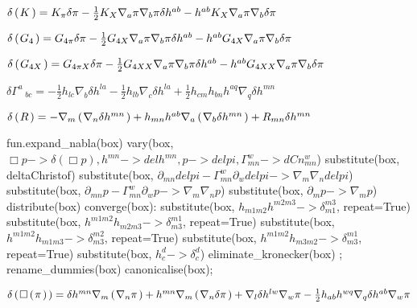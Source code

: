 \documentclass[10pt]{article}
\newcommand\brwrap[3]{%
  \setbox0=\hbox{$#2$}
  \left#1\vbox to \the\ht0{\hbox to 0pt{}}\right.\kern-.2em
  \begingroup #2\endgroup\kern-.15em
  \left.\vbox to \the\ht0{\hbox to 0pt{}}\right#3
}
\begin{document}
\begin{adjustwidth}{1em}{0cm}${}\delta\brwrap{(}{K}{)} = K_{\pi} \delta\pi - \frac{1}{2}K_{X} \nabla_{a}{\pi} \nabla_{b}{\pi} \delta h^{a b}-h^{a b} K_{X} \nabla_{a}{\pi} \nabla_{b}{\delta\pi}$\end{adjustwidth}
\begin{adjustwidth}{1em}{0cm}${}\delta\brwrap{(}{{G_{4}}}{)} = G_{4\pi} \delta\pi - \frac{1}{2}G_{4X} \nabla_{a}{\pi} \nabla_{b}{\pi} \delta h^{a b}-h^{a b} G_{4X} \nabla_{a}{\pi} \nabla_{b}{\delta\pi}$\end{adjustwidth}
\begin{adjustwidth}{1em}{0cm}${}\delta\brwrap{(}{G_{4X}}{)} = G_{4\pi X} \delta\pi - \frac{1}{2}G_{4XX} \nabla_{a}{\pi} \nabla_{b}{\pi} \delta h^{a b}-h^{a b} G_{4XX} \nabla_{a}{\pi} \nabla_{b}{\delta\pi}$\end{adjustwidth}
\begin{adjustwidth}{1em}{0cm}${}\delta\Gamma^{a}\,_{b c} =  - \frac{1}{2}h_{l c} \nabla_{b}{\delta h^{l a}} - \frac{1}{2}h_{l b} \nabla_{c}{\delta h^{l a}}+\frac{1}{2}h_{c m} h_{b n} h^{a q} \nabla_{q}{\delta h^{m n}}$\end{adjustwidth}
\begin{adjustwidth}{1em}{0cm}${}\delta\brwrap{(}{R}{)} = -\nabla_{m}\brwrap{(}{\nabla_{n}{\delta h^{m n}}}{)}+h_{m n} h^{a b} \nabla_{a}\brwrap{(}{\nabla_{b}{\delta h^{m n}}}{)}+R_{m n} \delta h^{m n}$\end{adjustwidth}
\begin{python}
fun.expand_nabla(box)
vary(box, $\Box{p} -> \delta(\Box{p}), h^{m n} -> delh^{m n}, p -> delpi, \Gamma^{w}_{m n} -> dCn^{w}_{m n}$)
substitute(box, deltaChristof)
substitute(box, $\partial_{m n}{delpi} - \Gamma^{w}_{m n}\partial_{w}{delpi} -> \nabla_{m}{\nabla_{n}{delpi}}$)
substitute(box, $\partial_{m n}{p} - \Gamma^{w}_{m n}\partial_{w}{p} -> \nabla_{m}{\nabla_{n}{p}}$)
substitute(box, $\partial_{m}{p} -> \nabla_{m}{p}$)
distribute(box)
converge(box):
	substitute(box, $h_{m1 m2}h^{m2 m3} -> \delta^{m3}_{m1}$, repeat=True)
	substitute(box, $h^{m1 m2}h_{m2 m3} -> \delta^{m1}_{m3}$, repeat=True)
	substitute(box, $h^{m1 m2}h_{m1 m3} -> \delta^{m2}_{m3}$, repeat=True)
	substitute(box, $h^{m1 m2}h_{m3 m2} -> \delta^{m1}_{m3}$, repeat=True)
	substitute(box, $h^{d}_{c} -> \delta^{d}_{c}$)
	eliminate_kronecker(box)
;
rename_dummies(box)
canonicalise(box);
\end{python}
\begin{adjustwidth}{1em}{0cm}${}\delta\brwrap{(}{\Box\brwrap{(}{\pi}{)}}{)} = \delta h^{m n} \nabla_{m}\brwrap{(}{\nabla_{n}{\pi}}{)}+h^{m n} \nabla_{m}\brwrap{(}{\nabla_{n}{\delta\pi}}{)}+\nabla_{l}{\delta h^{l w}} \nabla_{w}{\pi} - \frac{1}{2}h_{a b} h^{w q} \nabla_{q}{\delta h^{a b}} \nabla_{w}{\pi}$\end{adjustwidth}
\end{document}
